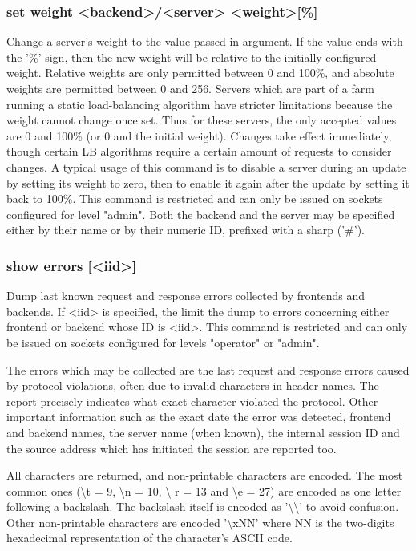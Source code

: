 \subsubsection[set weight]{set weight <backend>/<server> <weight>[\%]}
  Change a server's weight to the value passed in argument. If the value ends
  with the '\%' sign, then the new weight will be relative to the initially
  configured weight. Relative weights are only permitted between 0 and 100\%,
  and absolute weights are permitted between 0 and 256. Servers which are part
  of a farm running a static load-balancing algorithm have stricter limitations
  because the weight cannot change once set. Thus for these servers, the only
  accepted values are 0 and 100\% (or 0 and the initial weight). Changes take
  effect immediately, though certain LB algorithms require a certain amount of
  requests to consider changes. A typical usage of this command is to disable
  a server during an update by setting its weight to zero, then to enable it
  again after the update by setting it back to 100\%. This command is restricted
  and can only be issued on sockets configured for level "admin". Both the
  backend and the server may be specified either by their name or by their
  numeric ID, prefixed with a sharp ('\#').

\subsubsection[show errors]{show errors [<iid>]}
  Dump last known request and response errors collected by frontends and
  backends. If <iid> is specified, the limit the dump to errors concerning
  either frontend or backend whose ID is <iid>. This command is restricted
  and can only be issued on sockets configured for levels "operator" or
  "admin".

  The errors which may be collected are the last request and response errors
  caused by protocol violations, often due to invalid characters in header
  names. The report precisely indicates what exact character violated the
  protocol. Other important information such as the exact date the error was
  detected, frontend and backend names, the server name (when known), the
  internal session ID and the source address which has initiated the session
  are reported too.

  All characters are returned, and non-printable characters are encoded. The
  most common ones (\textbackslash t = 9, \textbackslash n = 10, \textbackslash
  r = 13 and \textbackslash e = 27) are encoded as one
  letter following a backslash. The backslash itself is encoded as
  '\textbackslash \textbackslash' to
  avoid confusion. Other non-printable characters are encoded '\textbackslash xNN' where
  NN is the two-digits hexadecimal representation of the character's ASCII
  code.

